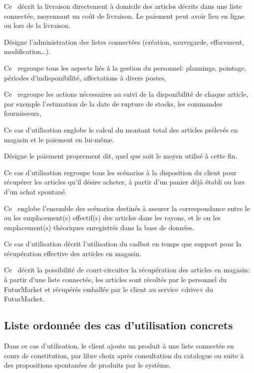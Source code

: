 Ce \cu\ décrit la livraison directement à domicile des articles décrits dans une liste connectée, moyennant un coût de livraison.
Le paiement peut avoir lieu en ligne ou lors de la livraison.

Désigne l'administration des listes connectées (création, sauvegarde, effacement, modification\dots).

Ce \cu\ regroupe tous les aspects liés à la gestion du personnel: plannings, pointage, périodes d'indisponibilité, affectations à divers postes, \etc

Ce \cu\ regroupe les actions nécessaires au suivi de la disponibilité de chaque article, par exemple l'estimation de la date de rupture de stocks, les commandes fournisseurs, \etc

Ce cas d'utilisation englobe le calcul du montant total des articles prélevés en magasin et le paiement en lui-même.

Désigne le paiement proprement dit, quel que soit le moyen utilisé à cette fin.

Ce cas d'utilisation regroupe tous les scénarios à la disposition du client pour récupérer les articles qu'il désire acheter, à partir d'un panier déjà établi ou lors d'un achat spontané.

Ce \cu\ englobe l'ensemble des scénarios destinés à assurer la correspondance entre le ou les emplacement(s) effectif(s) des articles dans les rayons, et le ou les emplacement(s) théoriques enregistrés dans la base de données.

Ce cas d'utilisation décrit l'utilisation du cadbot en temps que support pour la récupération effective des articles en magasin.

Ce \cu\ décrit la possibilité de court-circuiter la récupération des articles en magasin: à partir d'une liste connectée, les articles sont récoltés par le personnel du FuturMarket et récupérés emballés par le client au service «drive» du FuturMarket.


\subsection{Liste ordonnée des cas d'utilisation concrets}

Dans ce cas d'utilisation, le client ajoute un produit à une liste connectée en cours de constitution, par libre choix après consultation du catalogue ou suite à des propositions spontanées de produits par le système.

